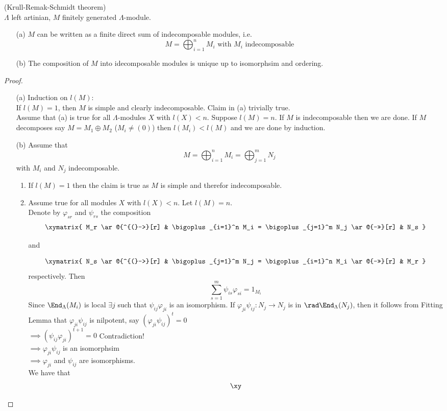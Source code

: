 \begin{thm}
(Krull-Remak-Schmidt theorem)\\
$\Lambda$ left artinian, $M$ finitely generated $\Lambda$-module.
\begin{enumerate}
\item[]
\item[(a)] $M$ can be written as a finite direct sum of indecomposable modules, i.e. \[M  = \bigoplus_{i=1}^n M_i \text{ with $M_i$ indecomposable}\]

\item[(b)] The composition of $M$ into idecomposable modules is unique up to isomorphsim and ordering.
\end{enumerate}

\begin{proof}
\begin{enumerate}
\item[(a)] Induction on $l(M)$:\\
If $l(M)=1$, then $M$ is simple and clearly indecomposable. Claim in (a) trivially true.\\
Assume that (a) is true for all $\Lambda$-modules $X$ with $l(X) < n$. Suppose $l(M)=n$. If $M$ is indecomposable then we are done. If $M$ decomposes say $M = M_1 \oplus M_2$ ($M_i \neq (0)$) then $l(M_i) < l(M)$ and we are done by induction.

\item[(b)] Assume that \[M = \bigoplus_{i=1}^n M_i = \bigoplus_{j=1}^m N_j\] with $M_i$ and $N_j$ indecomposable.
\begin{enumerate}
\item If $l(M)=1$ then the claim is true as $M$ is simple and therefor indecomposable.


\item Assume true for all modules $X$ with $l(X) < n$. Let $l(M)=n$.\\
Denote by $\varphi_{sr}$ and $\psi_{rs}$ the composition
\[\xymatrix{
M_r \ar@{^{(}->}[r] & \bigoplus_{i=1}^n M_i =  \bigoplus_{j=1}^m N_j \ar@{->>}[r] & N_s
}\]
\centerline{and}
\[\xymatrix{
N_s \ar@{^{(}->}[r] &  \bigoplus_{j=1}^m N_j = \bigoplus_{i=1}^n M_i \ar@{->>}[r] & M_r
}\]
respectively. Then \[\sum_{s=1}^m \psi_{is}\varphi_{si} = 1_{M_i}\] Since $\End_\Lambda(M_i)$ is local $\exists j$ such that $\psi_{ij}\varphi_{ji}$ is an isomorphism. If $\varphi_{ji}\psi_{ij} : N_j \to N_j$ is in $\rad\End_\Lambda(N_j)$, then it follows from Fitting Lemma that $\varphi_{ji}\psi_{ij}$ is nilpotent, say $(\varphi_{ji}\psi_{ij})^t = 0$\\
$\implies (\psi_{ij}\varphi_{ji})^{t+1} = 0$ Contradiction!\\
$\implies \varphi_{ji}\psi_{ij}$ is an isomorphsim\\
$\implies \varphi_{ji}$ and $\psi_{ij}$ are isomorphisms.\\
We have that 
\[\xy

\]
\end{enumerate}
\end{enumerate}
\end{proof}
\end{thm}
